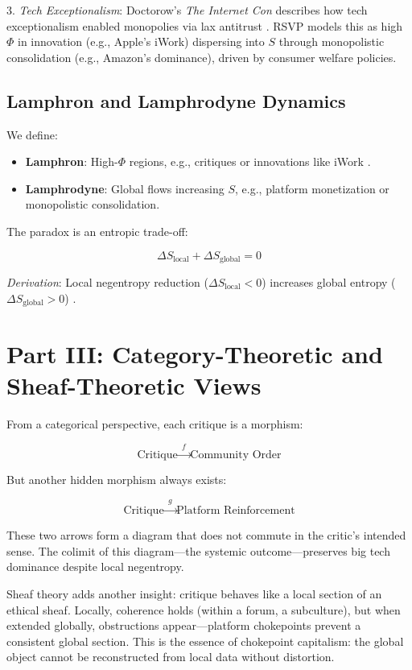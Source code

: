 \documentclass{article}
\begin{document}
3. \textit{Tech Exceptionalism}: Doctorow’s \textit{The Internet Con} describes how tech exceptionalism enabled monopolies via lax antitrust \cite{doctorow2023internetcon}. RSVP models this as high $\Phi$ in innovation (e.g., Apple’s iWork) dispersing into $S$ through monopolistic consolidation (e.g., Amazon’s dominance), driven by consumer welfare policies.

\subsection{Lamphron and Lamphrodyne Dynamics}

We define:

\begin{itemize}
    \item \textbf{Lamphron}: High-$\Phi$ regions, e.g., critiques or innovations like iWork \cite{doctorow2023internetcon}.
    \item \textbf{Lamphrodyne}: Global flows increasing $S$, e.g., platform monetization or monopolistic consolidation.
\end{itemize}

The paradox is an entropic trade-off:

\[
\Delta S_{\text{local}} + \Delta S_{\text{global}} = 0
\]

\textit{Derivation}: Local negentropy reduction ($\Delta S_{\text{local}} < 0$) increases global entropy ($\Delta S_{\text{global}} > 0$) \cite{shannon1948}.

\section{Part III: Category-Theoretic and Sheaf-Theoretic Views}

From a categorical perspective, each critique is a morphism:

\[
\text{Critique} \xrightarrow{\;\;f\;\;} \text{Community Order}
\]

But another hidden morphism always exists:

\[
\text{Critique} \xrightarrow{\;\;g\;\;} \text{Platform Reinforcement}
\]

These two arrows form a diagram that does not commute in the critic’s intended sense. The colimit of this diagram—the systemic outcome—preserves big tech dominance despite local negentropy.

Sheaf theory adds another insight: critique behaves like a local section of an ethical sheaf. Locally, coherence holds (within a forum, a subculture), but when extended globally, obstructions appear—platform chokepoints prevent a consistent global section. This is the essence of chokepoint capitalism: the global object cannot be reconstructed from local data without distortion.
\end{document}
